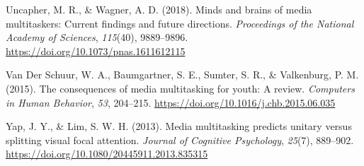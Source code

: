 \documentclass[
  man]{apa7}
\newlength{\cslhangindent}
\newenvironment{CSLReferences}[2] %
 {\begin{list}{}{%
  \setlength{\itemindent}{0pt}
  \setlength{\leftmargin}{0pt}
  \setlength{\parsep}{0pt}
  \ifodd #1
   \setlength{\leftmargin}{\cslhangindent}
   \setlength{\itemindent}{-1\cslhangindent}
  \fi
  \setlength{\itemsep}{#2\baselineskip}}}
 {\end{list}}
\begin{document}
\begin{CSLReferences}{1}{0}
Uncapher, M. R., \& Wagner, A. D. (2018). Minds and brains of media multitaskers: {Current} findings and future directions. \emph{Proceedings of the National Academy of Sciences}, \emph{115}(40), 9889--9896. \url{https://doi.org/10.1073/pnas.1611612115}

Van Der Schuur, W. A., Baumgartner, S. E., Sumter, S. R., \& Valkenburg, P. M. (2015). The consequences of media multitasking for youth: {A} review. \emph{Computers in Human Behavior}, \emph{53}, 204--215. \url{https://doi.org/10.1016/j.chb.2015.06.035}

Yap, J. Y., \& Lim, S. W. H. (2013). Media multitasking predicts unitary versus splitting visual focal attention. \emph{Journal of Cognitive Psychology}, \emph{25}(7), 889--902. \url{https://doi.org/10.1080/20445911.2013.835315}

\end{CSLReferences}
\end{document}
